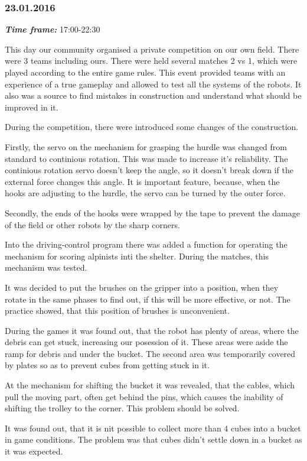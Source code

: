 \subsubsection{23.01.2016}
\textit{\textbf{Time frame:}} 17:00-22:30 

This day our community organised a private competition on our own field. There were 3 teams including ours. There were held several matches 2 vs 1, which were played according to the entire game rules. This event provided teams with an experience of a true gameplay and allowed to test all the systems of the robots. It also was a source to find mistakes in construction and understand what should be improved in it.

During the competition, there were introduced some changes of the construction.

Firstly, the servo on the mechanism for grasping the hurdle was changed from standard to continious rotation. This was made to increase it's reliability. The continious rotation servo doesn't keep the angle, so it doesn't break down if the external force changes this angle. It is important feature, because, when the hooks are adjusting to the hurdle, the servo can be turned by the outer force.

Secondly, the ends of the hooks were wrapped by the tape to prevent the damage of the field or other robots by the sharp corners.

Into the driving-control program there was added a function for operating the mechanism for scoring alpinists inti the shelter. During the matches, this mechanism was tested.

It was decided to put the brushes on the gripper into a position, when they rotate in the same phases to find out, if this will be more effective, or not. The practice showed, that this position of brushes is unconvenient.

During the games it was found out, that the robot has plenty of areas, where the debris can get stuck, increasing our posession of it. These areas were aside the ramp for debris and under the bucket. The second area was temporarily covered by plates so as to prevent cubes from getting stuck in it.

At the mechanism for shifting the bucket it was revealed, that the cables, which pull the moving part, often get behind the pins, which causes the inability of shifting the trolley to the corner. This problem should be solved.

It was found out, that it is nit possible to collect more than 4 cubes into a bucket in game conditions. The problem was that cubes didn't settle down in a bucket as it was expected.
